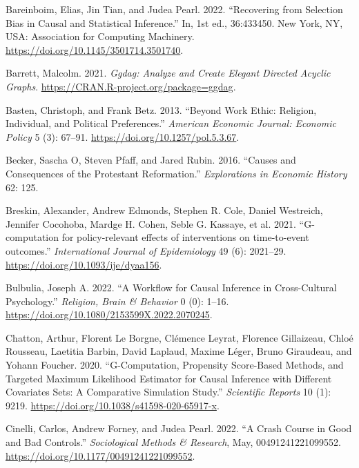 \documentclass[
  singlecolumn]{report}
\newlength{\cslhangindent}
\newlength{\cslentryspacingunit} %
\newenvironment{CSLReferences}[2] %
 {%
  \setlength{\parindent}{0pt}
  \ifodd #1
  \let\oldpar\par
  \def\par{\hangindent=\cslhangindent\oldpar}
  \fi
  \setlength{\parskip}{#2\cslentryspacingunit}
 }%
 {}
\begin{document}
\hypertarget{refs}{}
\begin{CSLReferences}{1}{0}
\leavevmode{}%
Bareinboim, Elias, Jin Tian, and Judea Pearl. 2022. {``Recovering from
Selection Bias in Causal and Statistical Inference.''} In, 1st ed.,
36:433450. New York, NY, USA: Association for Computing Machinery.
\url{https://doi.org/10.1145/3501714.3501740}.

\leavevmode{}%
Barrett, Malcolm. 2021. \emph{Ggdag: Analyze and Create Elegant Directed
Acyclic Graphs}. \url{https://CRAN.R-project.org/package=ggdag}.

\leavevmode{}%
Basten, Christoph, and Frank Betz. 2013. {``Beyond Work Ethic: Religion,
Individual, and Political Preferences.''} \emph{American Economic
Journal: Economic Policy} 5 (3): 67--91.
\url{https://doi.org/10.1257/pol.5.3.67}.

\leavevmode{}%
Becker, Sascha O, Steven Pfaff, and Jared Rubin. 2016. {``Causes and
Consequences of the Protestant Reformation.''} \emph{Explorations in
Economic History} 62: 125.

\leavevmode{}%
Breskin, Alexander, Andrew Edmonds, Stephen R. Cole, Daniel Westreich,
Jennifer Cocohoba, Mardge H. Cohen, Seble G. Kassaye, et al. 2021.
{``G-computation for policy-relevant effects of interventions on
time-to-event outcomes.''} \emph{International Journal of Epidemiology}
49 (6): 2021--29. \url{https://doi.org/10.1093/ije/dyaa156}.

\leavevmode{}%
Bulbulia, Joseph A. 2022. {``A Workflow for Causal Inference in
Cross-Cultural Psychology.''} \emph{Religion, Brain \& Behavior} 0 (0):
1--16. \url{https://doi.org/10.1080/2153599X.2022.2070245}.

\leavevmode{}%
Chatton, Arthur, Florent Le Borgne, Clémence Leyrat, Florence
Gillaizeau, Chloé Rousseau, Laetitia Barbin, David Laplaud, Maxime
Léger, Bruno Giraudeau, and Yohann Foucher. 2020. {``G-Computation,
Propensity Score-Based Methods, and Targeted Maximum Likelihood
Estimator for Causal Inference with Different Covariates Sets: A
Comparative Simulation Study.''} \emph{Scientific Reports} 10 (1): 9219.
\url{https://doi.org/10.1038/s41598-020-65917-x}.

\leavevmode{}%
Cinelli, Carlos, Andrew Forney, and Judea Pearl. 2022. {``A Crash Course
in Good and Bad Controls.''} \emph{Sociological Methods \& Research},
May, 00491241221099552. \url{https://doi.org/10.1177/00491241221099552}.


\end{CSLReferences}
\end{document}
